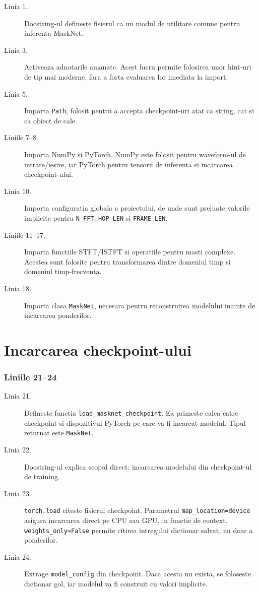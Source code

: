 \documentclass[12pt,a4paper]{report}
\newcommand{\codechunk}[2]{%
\subsection*{Liniile #1--#2}

}
\begin{document}
\begin{description}
    \item[Linia 1.] Docstring-ul defineste fisierul ca un modul de utilitare
    comune pentru inferenta MaskNet.

    \item[Linia 3.] Activeaza adnotarile amanate. Acest lucru permite folosirea
    unor hint-uri de tip mai moderne, fara a forta evaluarea lor imediata la
    import.

    \item[Linia 5.] Importa \texttt{Path}, folosit pentru a accepta checkpoint-uri
    atat ca string, cat si ca obiect de cale.

    \item[Liniile 7--8.] Importa NumPy si PyTorch. NumPy este folosit pentru
    waveform-ul de intrare/iesire, iar PyTorch pentru tensorii de inferenta si
    incarcarea checkpoint-ului.

    \item[Linia 10.] Importa configuratia globala a proiectului, de unde sunt
    preluate valorile implicite pentru \texttt{N\_FFT}, \texttt{HOP\_LEN} si
    \texttt{FRAME\_LEN}.

    \item[Liniile 11--17.] Importa functiile STFT/ISTFT si operatiile pentru masti
    complexe. Acestea sunt folosite pentru transformarea dintre domeniul timp si
    domeniul timp-frecventa.

    \item[Linia 18.] Importa clasa \texttt{MaskNet}, necesara pentru reconstruirea
    modelului inainte de incarcarea ponderilor.
\end{description}

\chapter{Incarcarea checkpoint-ului}

\codechunk{21}{24}

\begin{description}
    \item[Linia 21.] Defineste functia \texttt{load\_masknet\_checkpoint}. Ea primeste
    calea catre checkpoint si dispozitivul PyTorch pe care va fi incarcat modelul.
    Tipul returnat este \texttt{MaskNet}.

    \item[Linia 22.] Docstring-ul explica scopul direct: incarcarea modelului din
    checkpoint-ul de training.

    \item[Linia 23.] \texttt{torch.load} citeste fisierul checkpoint. Parametrul
    \texttt{map\_location=device} asigura incarcarea direct pe CPU sau GPU, in
    functie de context. \texttt{weights\_only=False} permite citirea intregului
    dictionar salvat, nu doar a ponderilor.

    \item[Linia 24.] Extrage \texttt{model\_config} din checkpoint. Daca acesta nu
    exista, se foloseste dictionar gol, iar modelul va fi construit cu valori
    implicite.
\end{description}
\end{document}
